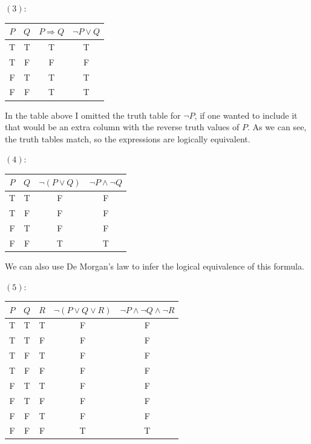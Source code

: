\begin{solution}
    $(3)$: 
    \begin{table}[H]
        \centering
        \begin{tabular}{cccc}
            \toprule
            $P$ & $Q$ & $P\Rightarrow Q$ & $\neg P\lor Q$\\
            \midrule
            T & T & T & T\\
            T & F & F & F\\
            F & T & T & T\\
            F & F & T & T\\
            \bottomrule
        \end{tabular}
    \end{table}
    In the table above I omitted the truth table for $\neg P$, if one wanted to include it that would be an extra column with the reverse truth values of $P$. As we can see, the truth tables match, so the expressions are logically equivalent. 

    $(4)$:
    \begin{table}[H]
        \centering
        \begin{tabular}{cccc}
            \toprule
            $P$ & $Q$ & $\neg (P\lor Q)$ & $\neg P\land \neg Q$\\
            \midrule
            T & T & F & F\\
            T & F & F & F\\
            F & T & F & F\\
            F & F & T & T\\
            \bottomrule
        \end{tabular}
    \end{table}
    We can also use De Morgan's law to infer the logical equivalence of this formula. 

    $(5)$: 
    \begin{table}[H]
        \centering
        \begin{tabular}{ccccc}
            \toprule
            $P$ & $Q$ & $R$ & $\neg(P\lor Q\lor R)$ & $\neg P\land \neg Q \land \neg R$\\
            \midrule
            T & T & T & F & F\\
            T & T & F & F & F\\
            T & F & T & F & F\\
            T & F & F & F & F\\
            F & T & T & F & F\\
            F & T & F & F & F\\
            F & F & T & F & F\\
            F & F & F & T & T\\
            \bottomrule
        \end{tabular}
    \end{table}


\end{solution}
